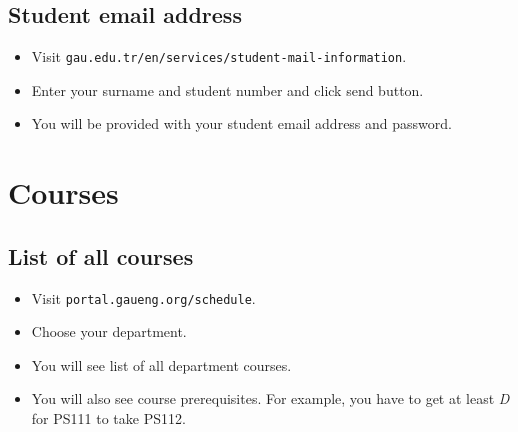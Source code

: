 \documentclass{article}
\begin{document}
\subsection{Student email address}

\begin{itemize}
	\item Visit \texttt{gau.edu.tr/en/services/student-mail-information}.	
	\item Enter your surname and student number and click send button.
	\item You will be provided with your student email address and password.
\end{itemize}




\section{Courses}

%



\subsection{List of all courses}

\begin{itemize}
	\item Visit \texttt{portal.gaueng.org/schedule}.
	\item Choose your department.
	\item You will see list of all department courses.
	\item You will also see course prerequisites. For example, you have to get at least \textit{D} for PS111 to take PS112.
\end{itemize}
\end{document}
